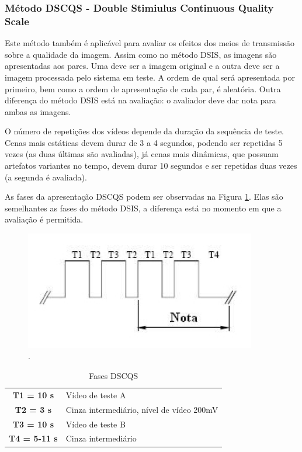\subsubsection{Método DSCQS - Double Stimiulus Continuous Quality Scale}

Este método também é aplicável para avaliar os efeitos dos meios de transmissão sobre a qualidade da imagem. Assim como no método DSIS, as imagens são apresentadas aos pares. Uma deve ser a imagem original e a outra deve ser a imagem processada pelo sistema em teste. A ordem de qual será apresentada por primeiro, bem como a ordem de apresentação de cada par, é aleatória. Outra diferença do método DSIS está na avaliação: o avaliador deve dar nota para ambas as imagens.

O número de repetições dos vídeos depende da duração da sequência de teste. Cenas mais estáticas devem durar de 3 a 4 segundos, podendo ser repetidas 5 vezes (as duas últimas são avaliadas), já cenas mais dinâmicas, que possuam artefatos variantes no tempo, devem durar 10 segundos e ser repetidas duas vezes (a segunda é avaliada).

As fases da apresentação DSCQS podem ser observadas na Figura \ref{fig:dscqsfases}. Elas são semelhantes as fases do método DSIS, a diferença está no momento em que a avaliação é permitida. 

\begin{figure}[!htb]
	\centering
	\includegraphics[width=0.9\textwidth]{./imgs/dscqsfases.png}
	\caption{.}
	\label{fig:dscqsfases}
\end{figure}

\begin{table}
	\centering
	\caption{Fases DSCQS}
	\label{tab:dsisfases}
	\begin{tabular}{c|l}
		\hline
		\textbf{T1 = 10 s} & Vídeo de teste A \\
		\textbf{T2 = 3 s} & Cinza intermediário, nível de vídeo 200mV \\
		\textbf{T3 = 10 s} & Vídeo de teste B \\
		\textbf{T4 = 5-11 s} & Cinza intermediário \\
		\hline
	\end{tabular}
\end{table}

